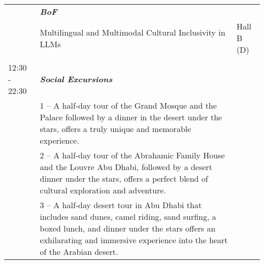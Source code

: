 \begin{longtable}{p{15mm}p{60mm}p{30mm}}
& \emph{\textbf{BoF}} & \\
& Multilingual and Multimodal Cultural Inclusivity in LLMs & Hall B (D) \\\\
{12:30 - 22:30} & \emph{\textbf{Social Excursions}} & \\
& 1 – A half-day tour of the Grand Mosque and the Palace followed by a dinner in the desert under the stars, offers a truly unique and memorable experience. & \\
& 2 – A half-day tour of the Abrahamic Family House and the Louvre Abu Dhabi, followed by a desert dinner under the stars, offers a perfect blend of cultural exploration and adventure. & \\
& 3 – A half-day desert tour in Abu Dhabi that includes sand dunes, camel riding, sand surfing, a boxed lunch, and dinner under the stars offers an exhilarating and immersive experience into the heart of the Arabian desert. & \\
\end{longtable}

